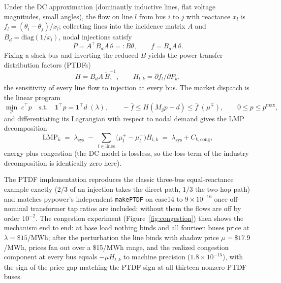 \documentclass[11pt]{article}
\begin{document}
Under the DC approximation (dominantly inductive lines, flat voltage
magnitudes, small angles), the flow on line $l$ from bus $i$ to $j$ with
reactance $x_l$ is $f_l = (\theta_i - \theta_j)/x_l$; collecting lines
into the incidence matrix $A$ and $B_d = \mathrm{diag}(1/x_l)$, nodal
injections satisfy
\begin{equation}
P = A^\top B_d A\,\theta =: B\theta, \qquad f = B_d A\,\theta .
\label{eq:dcflow}
\end{equation}
Fixing a slack bus and inverting the reduced $\tilde B$ yields the power
transfer distribution factors (PTDFs)
\begin{equation}
H = B_d A\, \tilde B^{-1}_{\uparrow}, \qquad
H_{l,k} = \partial f_l / \partial P_k,
\label{eq:ptdf}
\end{equation}
the sensitivity of every line flow to injection at every bus. The market
dispatch is the linear program
\begin{equation}
\min_{p}\; c^\top p \quad \text{s.t.}\quad
\mathbf{1}^\top p = \mathbf{1}^\top d \;(\lambda), \qquad
-\bar f \le H(M_g p - d) \le \bar f \;(\mu^\mp), \qquad
0 \le p \le p^{\max},
\label{eq:dcopf}
\end{equation}
and differentiating its Lagrangian with respect to nodal demand gives the
LMP decomposition
\begin{equation}
\mathrm{LMP}_k \;=\; \lambda_{\text{sys}} \;-\; \sum_{l \in \text{lines}} \big(\mu^+_l - \mu^-_l\big)
H_{l,k} \;=\; \lambda_{\text{sys}} + C_{k,\text{cong}},
\label{eq:lmp}
\end{equation}
energy plus congestion (the DC model is lossless, so the loss term of the
industry decomposition is identically zero here).

The PTDF implementation reproduces
the classic three-bus equal-reactance example exactly ($2/3$ of an
injection takes the direct path, $1/3$ the two-hop path) and matches
pypower's independent \texttt{makePTDF} on case14 \cite{thurner2018} to
$9\times10^{-16}$ once off-nominal transformer tap ratios are included;
without them the flows are off by order $10^{-2}$. The congestion
experiment (Figure~\ref{fig:congestion}) then shows the mechanism end to
end: at base load nothing binds and all fourteen buses price at
$\lambda = \$15$/MWh; after the perturbation the line binds with shadow
price $\mu = \$17.9$/MWh, prices fan out over a \$15/MWh range, and the
realized congestion component at every bus equals $-\mu H_{l,k}$ to
machine precision ($1.8\times10^{-15}$), with the sign of the price gap
matching the PTDF sign at all thirteen nonzero-PTDF buses.
\end{document}
